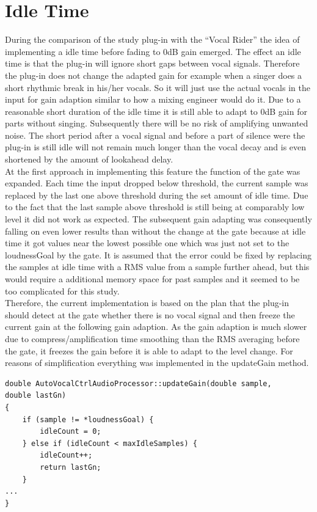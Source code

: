 \section{Idle Time}

During the comparison of the study plug-in with the “Vocal Rider” the idea of implementing a idle time before fading to 0dB gain emerged. The effect an idle time is that the plug-in will ignore short gaps between vocal signals. Therefore the plug-in does not change the adapted gain for example when a singer does a short rhythmic break in his/her vocals. So it will just use the actual vocals in the input for gain adaption similar to how a mixing engineer would do it. Due to a reasonable short duration of the idle time it is still able to adapt to 0dB gain for parts without singing. Subsequently there will be no risk of amplifying unwanted noise. The short period after a vocal signal and before a part of silence were the plug-in is still idle will not remain much longer than the vocal decay and is even shortened by the amount of lookahead delay.\\
At the first approach in implementing this feature the function of the gate was expanded. Each time the input dropped below threshold, the current sample was replaced by the last one above threshold during the set amount of idle time. Due to the fact that the last sample above threshold is still being at comparably low level it did not work as expected. The subsequent gain adapting was consequently falling on even lower results than without the change at the gate because at idle time it got values near the lowest possible one which was just not set to the loudnessGoal by the gate. It is assumed that the error could be fixed by replacing the samples at idle time with a RMS value from a sample further ahead, but this would require a additional memory space for past samples and it seemed to be too complicated for this study.\\
Therefore, the current implementation is based on the plan that the plug-in should detect at the gate whether there is no vocal signal and then freeze the current gain at the following gain adaption. As the gain adaption is much slower due to compress/amplification time smoothing than the RMS averaging before the gate, it freezes the gain before it is able to adapt to the level change. For reasons of simplification everything was implemented in the updateGain method.\\

\begin{lstlisting}[frame=single]
double AutoVocalCtrlAudioProcessor::updateGain(double sample, 
double lastGn)
{
    if (sample != *loudnessGoal) {
        idleCount = 0;
    } else if (idleCount < maxIdleSamples) {
        idleCount++;
        return lastGn;
    }
...
}
\end{lstlisting}

